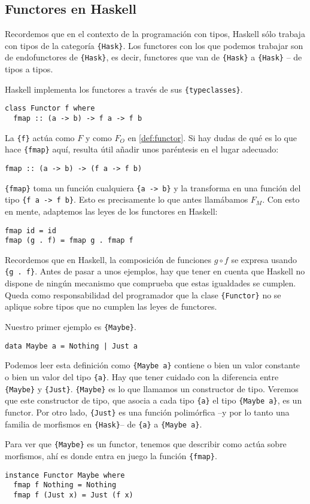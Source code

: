 \documentclass[12pt, twoside]{book}
\newcommand{\code}[1]{\Verb+{#1}+}
\begin{document}
\subsection{Functores en Haskell}
Recordemos que en el contexto de la programación con tipos, Haskell sólo trabaja con tipos de la categoría \code{Hask}.
Los functores con los que podemos trabajar son de endofunctores de \code{Hask}, es decir, functores que van de \code{Hask} a \code{Hask} -- de tipos a tipos.

Haskell implementa los functores a través de sus \code{typeclasses}.
\begin{verbatim}
class Functor f where
  fmap :: (a -> b) -> f a -> f b
\end{verbatim}

La \code{f} actúa como $F$ y como $F_O$ en \ref{def:functor}.
Si hay dudas de qué es lo que hace \code{fmap} aquí, resulta útil añadir unos paréntesis en el lugar adecuado:

\begin{verbatim}
fmap :: (a -> b) -> (f a -> f b)
\end{verbatim}

\code{fmap} toma un función cualquiera \code{a -> b} y la transforma en una función del tipo \code{f a -> f b}.
Esto es precisamente lo que antes llamábamos $F_M$.
Con esto en mente, adaptemos las leyes de los functores en Haskell:
\begin{verbatim}
fmap id = id
fmap (g . f) = fmap g . fmap f
\end{verbatim}
Recordemos que en Haskell, la composición de funciones $g \circ f$ se expresa usando \code{g . f}.
Antes de pasar a unos ejemplos, hay que tener en cuenta que Haskell no dispone de ningún mecanismo que comprueba que estas igualdades se cumplen.
Queda como responsabilidad del programador que la clase \code{Functor} no se aplique sobre tipos que no cumplen las leyes de functores. 

\begin{example}
Nuestro primer ejemplo es \code{Maybe}.
\begin{verbatim}
data Maybe a = Nothing | Just a 
\end{verbatim}

Podemos leer esta definición como \code{Maybe a} contiene o bien un valor constante o bien un valor del tipo \code{a}.
Hay que tener cuidado con la diferencia entre \code{Maybe} y \code{Just}.
\code{Maybe} es lo que llamamos un constructor de tipo.
Veremos que este constructor de tipo, que asocia a cada tipo \code{a} el tipo \code{Maybe a}, es un functor.
Por otro lado, \code{Just} es una función polimórfica --y por lo tanto una familia de morfismos en \code{Hask}-- de \code{a} a \code{Maybe a}.

Para ver que \code{Maybe} es un functor, tenemos que describir como actúa sobre morfismos, ahí es donde entra en juego la función \code{fmap}.

\begin{verbatim}
instance Functor Maybe where
  fmap f Nothing = Nothing
  fmap f (Just x) = Just (f x) 
\end{verbatim}
\end{example}
\end{document}
